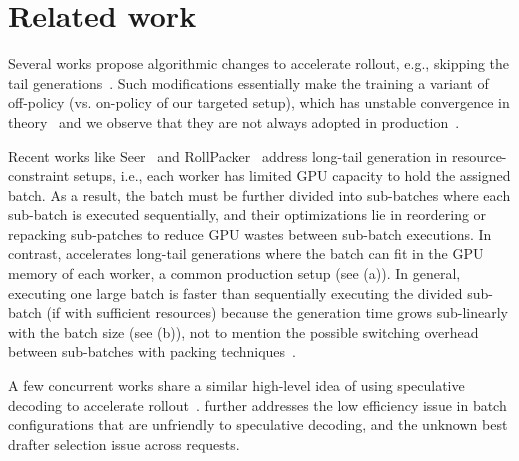 \section{Related work}
\label{sec:related-work}

Several works propose algorithmic changes to accelerate rollout,
e.g., skipping the tail generations~\cite{DBLP:journals/corr/abs-2501-12599,DBLP:journals/corr/abs-2504-13914,rhymerl}.
Such modifications essentially make the training 
a variant of off-policy (vs. on-policy of our targeted setup),
which has unstable convergence in theory~\cite{DBLP:journals/corr/abs-2506-20520,DBLP:journals/corr/abs-2503-14286,DBLP:journals/corr/abs-2405-08448}
and {we observe that they are not always adopted in production~\cite{seer,deepseek-r1}.}

Recent works like Seer~\cite{seer} 
and RollPacker~\cite{rollpacker} address long-tail generation 
in resource-constraint setups,
i.e., each worker has limited GPU capacity to hold the 
assigned batch. 
As a result, the batch must be further divided into sub-batches where 
each sub-batch is executed sequentially,
and their optimizations lie in reordering or repacking
sub-patches to reduce GPU wastes between sub-batch executions. 
In contrast, {\sys} accelerates long-tail generations where the batch can
fit in the GPU memory of each worker, a common production setup (see {} (a)).
In general, executing one large batch is faster than sequentially
executing the divided sub-batch (if with sufficient resources) 
because the generation time grows sub-linearly with the batch size 
(see {} (b)), 
not to mention the possible switching overhead between sub-batches 
with packing techniques~\cite{rollpacker}.

A few concurrent works 
share a similar high-level idea of using speculative decoding to accelerate rollout~\cite{tlt,seer}.
{\sys} further addresses the low efficiency issue in batch configurations that are unfriendly
to speculative decoding,
and the unknown best drafter selection issue across requests.


